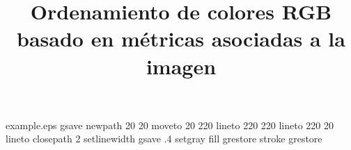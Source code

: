 %
%
%
%
%
\begin{filecontents*}{example.eps}
gsave
newpath
  20 20 moveto
  20 220 lineto
  220 220 lineto
  220 20 lineto
closepath
2 setlinewidth
gsave
  .4 setgray fill
grestore
stroke
grestore
\end{filecontents*}
%
\documentclass[twocolumn,fleqn]{svjour3}
%
\smartqed  %
%
\usepackage[numbers]{natbib}
\usepackage{amssymb}
\usepackage{amsmath}
\usepackage{textcomp}
\usepackage[T1]{fontenc}
\usepackage[utf8]{inputenc}
\usepackage[spanish]{babel}
\usepackage{csquotes}
\usepackage{enumerate}
\usepackage{enumitem}
\usepackage{caption}
\captionsetup{compatibility=false}
\usepackage{subcaption}
\usepackage{listings}
\usepackage{array} %
\usepackage{multirow} %
\usepackage{nicefrac} %
\usepackage[dvipsnames]{xcolor}
\usepackage{pgfplots}
\pgfplotsset{compat=default}
\usepackage{pgfplotstable}
\usetikzlibrary{spy}
\usepackage{longtable}
\usepackage{array}
\usepackage{pdflscape}
\usepackage{booktabs}
\usepackage{graphicx} %



%
%
%
%
\journalname{}


%


\title{Ordenamiento de colores RGB basado en m\'etricas asociadas a la imagen  %
}

